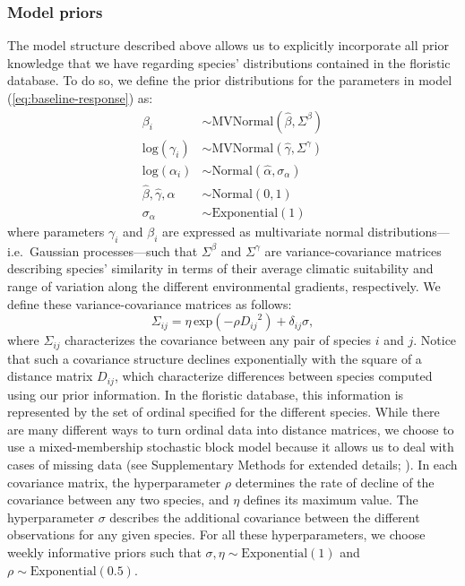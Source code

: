 \documentclass[11pt, a4paper]{article}
\begin{document}
\subsubsection*{Model priors}
The model structure described above allows us to explicitly incorporate all prior knowledge that we have regarding species' distributions contained in the floristic database. To do so, we define the prior distributions for the parameters in model (\ref{eq:baseline-response}) as:
\begin{equation} 
\begin{split}
\beta_{i}  & \sim \text{MVNormal}\left(\hat{\beta}, \Sigma^{\beta}\right)\\
\text{log}(\gamma_{i})  & \sim \text{MVNormal}\left(\hat{\gamma}, \Sigma^{\gamma}\right)\\
\text{log}(\alpha_{i}) & \sim \text{Normal}\left(\hat{\alpha}, \sigma_{\alpha}\right)\\
\hat{\beta}, 
\hat{\gamma}, 
\hat{\alpha}  & \sim \text{Normal}\left(0,1\right)\\
\sigma_{\alpha}  & \sim \text{Exponential}\left(1\right)
\end{split}
\label{eq:baseline-priors}
\end{equation} 
where parameters $\gamma_i$ and $\beta_i$ are expressed as multivariate normal distributions---i.e.~Gaussian processes---such that $\Sigma^{\beta}$ and $\Sigma^{\gamma}$ are variance-covariance matrices describing species' similarity in terms of their average climatic suitability and range of variation along the different environmental gradients, respectively. We define these variance-covariance matrices as follows:
\begin{equation} 
\Sigma_{ij} = \eta\,\text{exp}\left(-\rho {D_{ij}}^2\right) + \delta_{ij} \sigma ,
\label{eq:covariance-baseline}
\end{equation}
where $\Sigma_{ij}$ characterizes the covariance between any pair of species $i$ and $j$. Notice that such a covariance structure declines exponentially with the square of a distance matrix $D_{ij}$, which characterize differences between species computed using our prior information. In the floristic database, this information is represented by the set of ordinal specified for the different species. While there are many different ways to turn ordinal data into distance matrices, we choose to use a mixed-membership stochastic block model because it allows us to deal with cases of missing data (see Supplementary Methods for extended details; \citealt{godoy-loriteAccurateScalableSocial2016}). In each covariance matrix, the hyperparameter $\rho$ determines the rate of decline of the covariance between any two species, and $\eta$ defines its maximum value. The hyperparameter $\sigma$ describes the additional covariance between the different observations for any given species. For all these hyperparameters, we choose weekly informative priors such that $\sigma , \eta \sim \text{Exponential}\left(1\right)$ and $\rho\sim \text{Exponential}\left(0.5\right)$.
\end{document}
